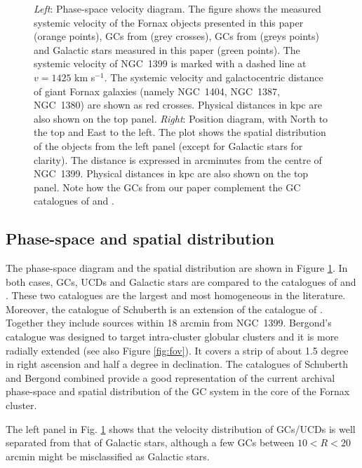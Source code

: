 \documentclass[useAMS,usenatbib]{mn2e}
\begin{document}
\begin{figure}
\caption{\textit{Left}: Phase-space velocity diagram. The figure shows the measured systemic velocity of the Fornax objects presented in this paper (orange points), GCs from \citet{Schuberth} (grey crosses), GCs from \citet{Bergond07} (greys points) and Galactic stars measured in this paper (green points). The systemic velocity of NGC~1399 is marked with a dashed line at $v = 1425$ km s$^{-1}$. The systemic velocity and galactocentric distance of giant Fornax galaxies (namely NGC~1404, NGC~1387, NGC~1380) are shown as red crosses. Physical distances in kpc are also shown on the top panel. \textit{Right}: Position diagram, with North to the top and East to the left. The plot shows the spatial distribution of the objects from the left panel (except for Galactic stars for clarity). The distance is expressed in arcminutes from the centre of NGC~1399. Physical distances in kpc are also shown on the top panel.  Note how the GCs from our paper complement the GC catalogues of \citet{Schuberth} and \citet{Bergond07}. }
\label{fig:phase-space}
\end{figure}

\subsection{Phase-space and spatial distribution}

The phase-space diagram and the spatial distribution are shown in Figure \ref{fig:phase-space}. In both cases, GCs, UCDs and Galactic stars are compared to the catalogues of \citet{Bergond07} and \citet{Schuberth}. These two catalogues are the largest and most homogeneous in the literature. Moreover, the catalogue of Schuberth is an extension of the catalogue of \citet{Dirsch04}. Together they include sources within 18 arcmin from NGC~1399. Bergond's catalogue was designed to target intra-cluster globular clusters and it is more radially extended (see also Figure \ref{fig:fov}). It covers a strip of about 1.5 degree in right ascension and half a degree in declination. The catalogues of Schuberth and Bergond combined provide a good representation of the current archival phase-space and spatial distribution of the GC system in the core of the Fornax cluster. 

The left panel in Fig. \ref{fig:phase-space} shows that the velocity distribution of GCs/UCDs is well separated from that of Galactic stars, although a few GCs between $10<R<20$ arcmin might be misclassified as Galactic stars. 
\end{document}
